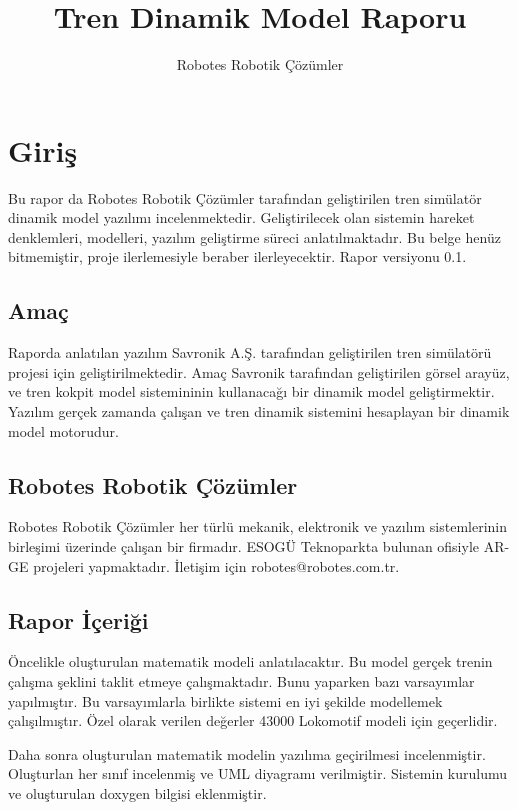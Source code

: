 \documentclass[10pt,a4paper]{article}
\author{Robotes Robotik Çözümler}
\title{Tren Dinamik Model Raporu }
\begin{document}
\maketitle
\newpage

\tableofcontents
\newpage

\section{Giriş}
Bu rapor da Robotes Robotik Çözümler tarafından geliştirilen tren simülatör dinamik model yazılımı incelenmektedir. Geliştirilecek olan sistemin hareket denklemleri, modelleri, yazılım geliştirme süreci anlatılmaktadır. Bu belge henüz bitmemiştir, proje ilerlemesiyle beraber ilerleyecektir. Rapor versiyonu 0.1. 
 
\subsection{Amaç}
Raporda anlatılan yazılım Savronik A.Ş. tarafından geliştirilen tren simülatörü projesi için geliştirilmektedir. Amaç Savronik tarafından geliştirilen görsel arayüz, ve tren kokpit model sistemininin  kullanacağı bir dinamik model geliştirmektir. Yazılım gerçek zamanda çalışan ve tren dinamik sistemini hesaplayan bir dinamik model motorudur. 

\subsection{Robotes Robotik Çözümler}
Robotes Robotik Çözümler her türlü mekanik, elektronik ve yazılım sistemlerinin birleşimi üzerinde 
çalışan bir firmadır. ESOGÜ Teknoparkta bulunan ofisiyle AR-GE projeleri yapmaktadır. İletişim için robotes@robotes.com.tr.


\subsection{Rapor İçeriği}
Öncelikle oluşturulan matematik modeli anlatılacaktır. Bu model gerçek trenin çalışma şeklini taklit etmeye çalışmaktadır. Bunu yaparken bazı varsayımlar yapılmıştır. Bu varsayımlarla birlikte sistemi en iyi şekilde modellemek çalışılmıştır. Özel olarak verilen değerler 43000 Lokomotif modeli için geçerlidir.

Daha sonra oluşturulan matematik modelin yazılıma geçirilmesi incelenmiştir. Oluşturlan her sınıf incelenmiş ve UML diyagramı verilmiştir. Sistemin kurulumu ve oluşturulan doxygen bilgisi eklenmiştir.
\end{document}
